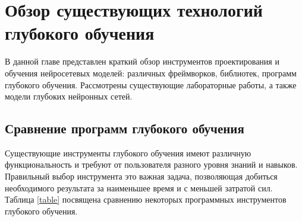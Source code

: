 \chapter{Обзор существующих технологий глубокого обучения}

В данной главе представлен краткий обзор инструментов проектирования и обучения нейросетевых моделей: различных фреймворков, библиотек,  программ глубокого обучения. Рассмотрены существующие лабораторные работы, а также модели глубоких нейронных сетей.

\section{Сравнение программ глубокого обучения}

Существующие инструменты глубокого обучения имеют различную функциональность и требуют от пользователя разного уровня знаний и навыков. Правильный выбор инструмента это важная задача, позволяющая добиться необходимого результата за наименьшее время и с меньшей затратой сил. Таблица  \ref{table} посвящена сравнению некоторых программных инструментов глубокого обучения. 

